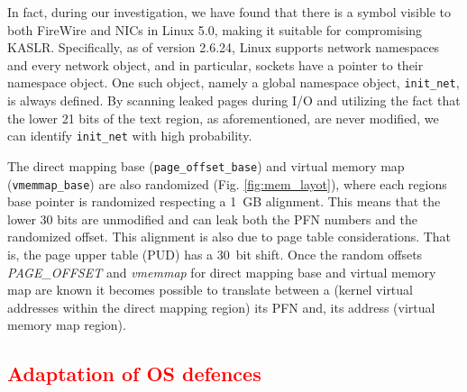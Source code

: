 In fact, during our investigation, we have found that there is a symbol visible to both FireWire and NICs in Linux 5.0, making it suitable for compromising KASLR. Specifically, as of version 2.6.24, Linux supports network namespaces and every network object, and in particular, sockets have a pointer to their namespace object. One such object, namely a global namespace object, \texttt{init\_net}, is always defined. By scanning leaked pages during I/O and utilizing the fact that the lower 21 bits of the text region, as aforementioned, are never modified, we can identify \texttt{init\_net} with high probability.

The direct mapping base (\texttt{page\_offset\_base}) and virtual memory map (\texttt{vmemmap\_base}) are also randomized (Fig. \ref{fig:mem_layot}), where each regions base pointer is randomized respecting a 1~GB alignment. This means that the lower 30 bits are unmodified and can leak both the PFN numbers and the randomized offset. This alignment is also due to page table considerations. That is, the page upper table (PUD) has a 30~bit shift. Once the random offsets \textit{PAGE\_OFFSET} and \textit{vmemmap} for direct mapping base and virtual memory map are known it becomes possible to translate between a \kva{} (kernel virtual addresses within the direct mapping region) its PFN and, its \page{} address (virtual memory map region).

\subsection{\textcolor{red}{Adaptation of OS defences}}

